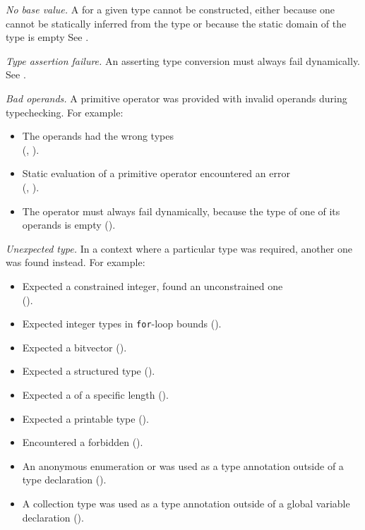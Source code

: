 \begin{description}
\hypertarget{def-nobasevalue}{}
\item[$\NoBaseValue$]
  \textit{No base value.}
  A \basevalueterm{} for a given type cannot be constructed, either because one cannot be statically inferred from the type or because the static domain of the type is empty
  See .

\hypertarget{def-typeassertionfailure}{}
\item[$\TypeAssertionFailure$]
  \textit{Type assertion failure.}
  An asserting type conversion must always fail dynamically.
  See .

\hypertarget{def-badoperands}{}
\item[$\BadOperands$]
  \textit{Bad operands.}
  A primitive operator was provided with invalid operands during typechecking.
  For example:
  \begin{itemize}
    \item The operands had the wrong types \\
      (, ).
    \item Static evaluation of a primitive operator encountered an error \\
      (, ).
    \item The operator must always fail dynamically, because the type of one of its operands is empty ().
  \end{itemize}

\hypertarget{def-unexpectedtype}{}
\item[$\UnexpectedType$]
  \textit{Unexpected type.}
  In a context where a particular type was required, another one was found instead.
  For example:
  \begin{itemize}
    \item Expected a constrained integer, found an unconstrained one \\
      ().
    \item Expected integer types in \texttt{for}-loop bounds ().
    \item Expected a bitvector ().
    \item Expected a structured type ().
    \item Expected a \tupletypeterm{} of a specific length ().
    \item Expected a printable type ().
    \item Encountered a forbidden \pendingconstrainedintegertypeterm{} ().
    \item An anonymous enumeration or \structuredtypeterm{} was used as a type annotation outside of a type declaration ().
    \item A collection type was used as a type annotation outside of a global variable declaration ().
  \end{itemize}


\end{description}
